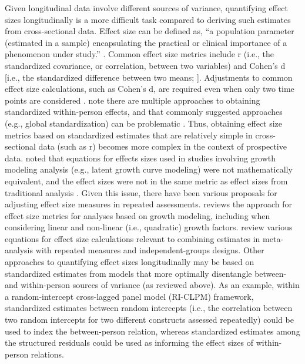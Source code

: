 \documentclass[
  number,
  preprint,
  3p,
  twocolumn]{elsarticle}
\begin{document}
Given longitudinal data involve different sources of variance,
quantifying effect sizes longitudinally is a more difficult task
compared to deriving such estimates from cross-sectional data. Effect
size can be defined as, ``a population parameter (estimated in a sample)
encapsulating the practical or clinical importance of a phenomenon under
study.'' \citep{kraemer2014}. Common effect size metrics include r
(i.e., the standardized covariance, or correlation, between two
variables) and Cohen's d {[}i.e., the standardized difference between
two means; \citep{cohen1988}{]}. Adjustments to common effect size
calculations, such as Cohen's d, are required even when only two time
points are considered \citep[e.g., see][]{morris2002}. \citep{wang2019}
note there are multiple approaches to obtaining standardized
within-person effects, and that commonly suggested approaches (e.g.,
global standardization) can be problematic \citep[see][for more
details]{wang2019}. Thus, obtaining effect size metrics based on
standardized estimates that are relatively simple in cross-sectional
data (such as r) becomes more complex in the context of prospective
data. \citep{feingold2009} noted that equations for effects sizes used
in studies involving growth modeling analysis (e.g., latent growth curve
modeling) were not mathematically equivalent, and the effect sizes were
not in the same metric as effect sizes from traditional analysis
\citep[see][for more details]{feingold2009}. Given this issue, there
have been various proposals for adjusting effect size measures in
repeated assessments. \citep{feingold2019} reviews the approach for
effect size metrics for analyses based on growth modeling, including
when considering linear and non-linear (i.e., quadratic) growth factors.
\citep{morris2002} review various equations for effect size calculations
relevant to combining estimates in meta-analysis with repeated measures
and independent-groups designs. Other approaches to quantifying effect
sizes longitudinally may be based on standardized estimates from models
that more optimally disentangle between- and within-person sources of
variance (as reviewed above). As an example, within a random-intercept
cross-lagged panel model (RI-CLPM) framework, standardized estimates
between random intercepts (i.e., the correlation between two random
intercepts for two different constructs assessed repeatedly) could be
used to index the between-person relation, whereas standardized
estimates among the structured residuals could be used as informing the
effect sizes of within-person relations.
\end{document}
